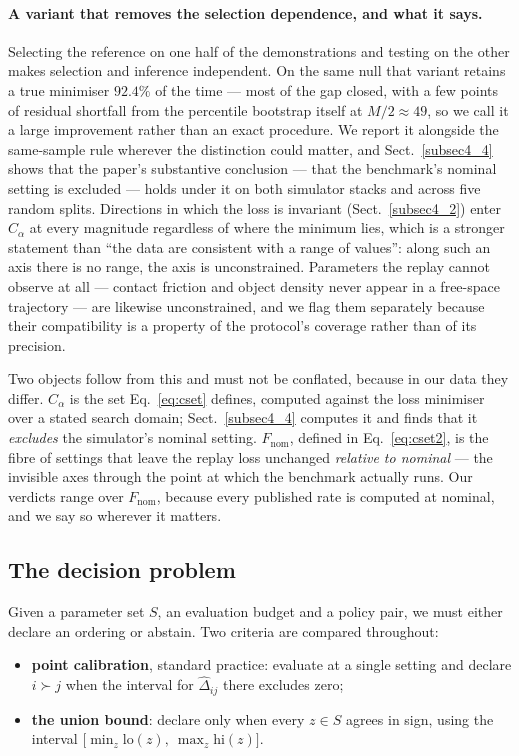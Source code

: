 \documentclass[pdflatex,iicol,sn-apa]{sn-jnl}
\theoremstyle{remark}
\begin{document}
\paragraph{A variant that removes the selection dependence, and what it says.} Selecting the reference on one half
of the demonstrations and testing on the other makes selection and inference independent. On the
same null that variant retains a true minimiser $92.4\%$ of the time --- most of the gap closed,
with a few points of residual shortfall from the percentile bootstrap itself at $M/2 \approx 49$, so
we call it a large improvement rather than an exact procedure. We report it alongside the
same-sample rule wherever the distinction could matter, and Sect.~\ref{subsec4_4} shows that the
paper's substantive conclusion --- that the benchmark's nominal setting is excluded --- holds under
it on both simulator stacks and across five random splits. Directions in which the loss is invariant
(Sect.~\ref{subsec4_2}) enter $C_\alpha$ at every magnitude regardless of where the minimum lies,
which is a stronger statement than ``the data are consistent with a range of values'': along such an
axis there is no range, the axis is unconstrained. Parameters the replay cannot observe at all ---
contact friction and object density never appear in a free-space trajectory --- are likewise
unconstrained, and we flag them separately because their compatibility is a property of the
protocol's coverage rather than of its precision.

Two objects follow from this and must not be conflated, because in our data they differ.
$C_\alpha$ is the set Eq.~\eqref{eq:cset} defines, computed against the loss minimiser over a stated
search domain; Sect.~\ref{subsec4_4} computes it and finds that it \emph{excludes} the simulator's
nominal setting. $F_{\mathrm{nom}}$, defined in Eq.~\eqref{eq:cset2}, is the fibre of settings that
leave the replay loss unchanged \emph{relative to nominal} --- the invisible axes through the point
at which the benchmark actually runs. Our verdicts range over $F_{\mathrm{nom}}$, because every
published rate is computed at nominal, and we say so wherever it matters.

\subsection{The decision problem}\label{subsec3_3}

Given a parameter set $S$, an evaluation budget and a policy pair, we must either declare an ordering
or abstain. Two criteria are compared throughout:
\begin{itemize}
\item \textbf{point calibration}, standard practice: evaluate at a single setting and declare
$i \succ j$ when the interval for $\hat\Delta_{ij}$ there excludes zero;
\item \textbf{the union bound}: declare only when every $z \in S$ agrees in sign, using the
interval $\big[\min_{z} \mathrm{lo}(z),\ \max_{z} \mathrm{hi}(z)\big]$.
\end{itemize}
\end{document}
